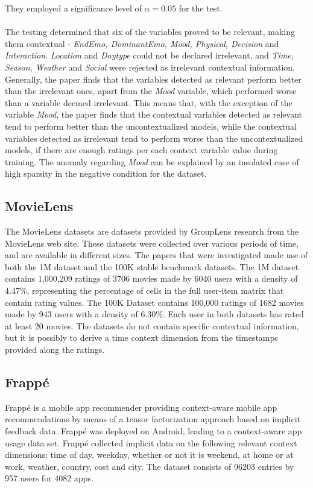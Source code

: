 They employed a significance level of $\alpha = 0.05$ for the test.
\\\\
The testing determined that six of the variables proved to be relevant, making them contextual - \textit{EndEmo, DominantEmo, Mood, Physical, Decision} and \textit{Interaction}.
\textit{Location} and \textit{Daytype} could not be declared irrelevant, and \textit{Time, Season, Weather} and \textit{Social} were rejected as irrelevant contextual information.
Generally, the paper finds that the variables detected as relevant perform better than the irrelevant ones, apart from the \textit{Mood} variable, which performed worse than a variable deemed irrelevant.
This means that, with the exception of the variable \textit{Mood}, the paper finds that the contextual variables detected as relevant tend to perform better than the uncontextualized models, while the contextual variables detected as irrelevant tend to perform worse than the uncontextualized models, if there are enough ratings per each context variable value during training.
The anomaly regarding \textit{Mood} can be explained by an insolated case of high sparsity in the negative condition for the dataset.



\subsection{MovieLens}
The MovieLens datasets are datasets provided by GroupLens research from the MovieLens web site.
These datasets were collected over various periods of time, and are available in different sizes\cite{movielens}.
The papers that were investigated made use of both the 1M dataset and the 100K stable benchmark datasets.
The 1M dataset contains 1,000,209 ratings of 3706 movies made by 6040 users with a density of 4.47\%, representing the percentage of cells in the full user-item matrix that contain rating values\cite{MovieLens2015}.
The 100K Dataset contains 100,000 ratings of 1682 movies made by 943 users with a density of 6.30\%\cite{MovieLens2015}.
Each user in both datasets has rated at least 20 movies.
The datasets do not contain specific contextual information, but it is possibly to derive a time context dimension from the timestamps provided along the ratings.

\subsection{Frappé}
Frappé is a mobile app recommender providing context-aware mobile app recommendations by means of a tensor factorization approach based on implicit feedback data\cite{baltrunas2015frappe}.
Frappé was deployed on Android, leading to a context-aware app usage data set.
Frappé collected implicit data on the following relevant context dimensions: time of day, weekday, whether or not it is weekend, at home or at work, weather, country, cost and city. 
The dataset consists of 96203 entries by 957 users for 4082 apps.

